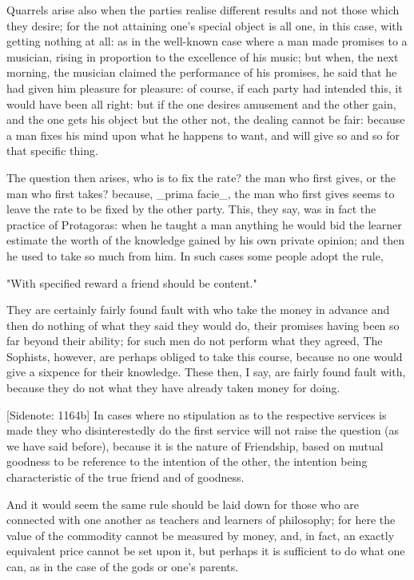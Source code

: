 Quarrels arise also when the parties realise different results and not
those which they desire; for the not attaining one's special object is
all one, in this case, with getting nothing at all: as in the well-known
case where a man made promises to a musician, rising in proportion to
the excellence of his music; but when, the next morning, the musician
claimed the performance of his promises, he said that he had given him
pleasure for pleasure: of course, if each party had intended this, it
would have been all right: but if the one desires amusement and the
other gain, and the one gets his object but the other not, the dealing
cannot be fair: because a man fixes his mind upon what he happens to
want, and will give so and so for that specific thing.

The question then arises, who is to fix the rate? the man who first
gives, or the man who first takes? because, _prima facie_, the man who
first gives seems to leave the rate to be fixed by the other party.
This, they say, was in fact the practice of Protagoras: when he taught
a man anything he would bid the learner estimate the worth of the
knowledge gained by his own private opinion; and then he used to take so
much from him. In such cases some people adopt the rule,

  "With specified reward a friend should be content."

They are certainly fairly found fault with who take the money in advance
and then do nothing of what they said they would do, their promises
having been so far beyond their ability; for such men do not perform
what they agreed, The Sophists, however, are perhaps obliged to take
this course, because no one would give a sixpence for their knowledge.
These then, I say, are fairly found fault with, because they do not what
they have already taken money for doing.

[Sidenote: 1164b] In cases where no stipulation as to the respective
services is made they who disinterestedly do the first service will not
raise the question (as we have said before), because it is the nature of
Friendship, based on mutual goodness to be reference to the intention of
the other, the intention being characteristic of the true friend and of
goodness.

And it would seem the same rule should be laid down for those who are
connected with one another as teachers and learners of philosophy; for
here the value of the commodity cannot be measured by money, and, in
fact, an exactly equivalent price cannot be set upon it, but perhaps it
is sufficient to do what one can, as in the case of the gods or one's
parents.

